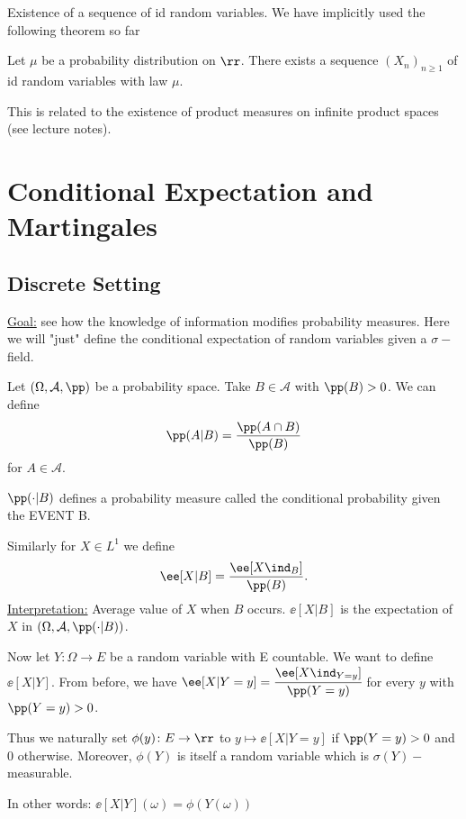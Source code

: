 \documentclass[../main.tex]{subfiles}
\begin{document}
\begin{remark}
    Existence of a sequence of id random variables. We have implicitly used the
    following theorem so far
\begin{theorem}
  Let $\mu$ be a probability distribution on $\rr$. There exists a sequence
  $(X_n)_{n \geq 1}$ of id random variables with law $\mu$.
\end{theorem}
    This is related to the existence of product measures on infinite product
    spaces (see lecture notes).
\end{remark}

\section{Conditional Expectation and Martingales}
\subsection{Discrete Setting}
\underline{Goal:} see how the knowledge of information modifies probability
measures. Here we will "just" define the conditional expectation of random
variables given a $\sigma-$field.

\vspace{0.5em}
\noindent
Let $(\Omega, \mathcal{A}, \pp)$ be a probability space. Take $B \in
\mathcal{A}$ with $\pp(B) > 0$. We can define
\[
  \pp(A | B) = \frac{\pp(A \cap B)}{\pp(B)} 
\]
for $A \in \mathcal{A}$. 

\vspace{0.5em}
\noindent
$\pp(\cdot \vert B)$ defines a probability measure called the conditional
probability given the EVENT B.

\vspace{0.5em}
\noindent
Similarly for $X \in L^1$ we define 
\[
  \ee[X | B] = \frac{\ee[X \ind_{B}]}{\pp(B)} 
.\] 
\underline{Interpretation:} Average value of $X$ when $B$ occurs. $\ee[X | B]$
is the expectation of $X$ in $(\Omega, \mathcal{A}, \pp(\cdot | B))$.

\vspace{1em}
\noindent
Now let $Y \colon \Omega \to E$ be a random variable with E countable. We want
to define $\ee[X | Y]$. From before, we have $\ee[X | Y = y] = \cfrac{\ee[X \ind_{Y =
y}]}{\pp(Y = y)}$ for every $y$ with $\pp(Y = y) > 0$. 

\vspace{0.5em}
\noindent
Thus we naturally set $\phi(y) \colon E \to \rr$ to $y \mapsto \ee[X | Y = y]$
if $\pp(Y = y) > 0$ and $0$ otherwise. Moreover, $\phi(Y)$ is itself a random
variable which is $\sigma(Y)-$measurable.

\vspace{0.3em}\noindent
In other words: $\ee[X | Y] (\omega) = \phi(Y(\omega))$
\end{document}
